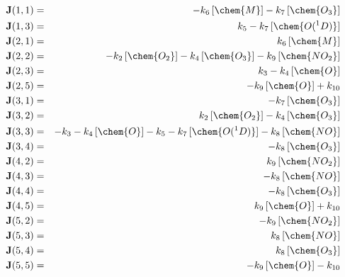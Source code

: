 \documentclass[twoside]{article}
\begin{document}
\begin{eqnarray*}
  \mathbf{J}(1,1) & = & - k_{6}\, [\chem{M}] - k_{7}\, [\chem{O_3}]\\
  \mathbf{J}(1,3) & = & k_{5} - k_{7}\, [\chem{O(^1D)}]\\
  \mathbf{J}(2,1) & = & k_{6}\, [\chem{M}]\\
  \mathbf{J}(2,2) & = & - k_{2}\, [\chem{O_2}] - k_{4}\, [\chem{O_3}] 
                        - k_{9}\, [\chem{NO_2}]\\
  \mathbf{J}(2,3) & = & k_{3} - k_{4}\, [\chem{O}]\\
  \mathbf{J}(2,5) & = & - k_{9}\, [\chem{O}] + k_{10}\\
  \mathbf{J}(3,1) & = & - k_{7}\, [\chem{O_3}]\\
  \mathbf{J}(3,2) & = & k_{2}\, [\chem{O_2}] - k_{4}\, [\chem{O_3}]\\
  \mathbf{J}(3,3) & = & - k_{3} - k_{4}\, [\chem{O}] - k_{5} - k_{7}\, 
                        [\chem{O(^1D)}] - k_{8}\, [\chem{NO}]\\
  \mathbf{J}(3,4) & = & - k_{8}\, [\chem{O_3}]\\
  \mathbf{J}(4,2) & = & k_{9}\, [\chem{NO_2}]\\
  \mathbf{J}(4,3) & = & - k_{8}\, [\chem{NO}]\\
  \mathbf{J}(4,4) & = & - k_{8}\, [\chem{O_3}]\\
  \mathbf{J}(4,5) & = & k_{9}\, [\chem{O}] + k_{10}\\
  \mathbf{J}(5,2) & = & - k_{9}\, [\chem{NO_2}]\\
  \mathbf{J}(5,3) & = & k_{8}\, [\chem{NO}]\\
  \mathbf{J}(5,4) & = & k_{8}\, [\chem{O_3}]\\
  \mathbf{J}(5,5) & = & - k_{9}\, [\chem{O}] - k_{10}\\
\end{eqnarray*}
\end{document}
